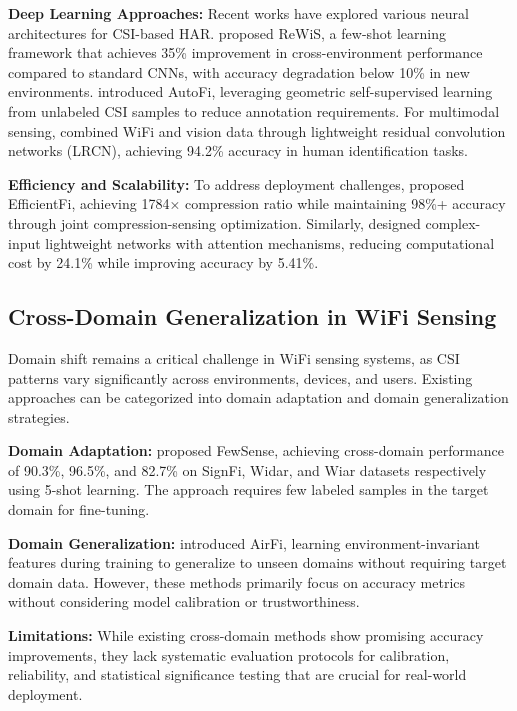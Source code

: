\documentclass[10pt,conference]{IEEEtran}
\begin{document}
\textbf{Deep Learning Approaches:} Recent works have explored various neural architectures for CSI-based HAR. \cite{rewis2022} proposed ReWiS, a few-shot learning framework that achieves 35\% improvement in cross-environment performance compared to standard CNNs, with accuracy degradation below 10\% in new environments. \cite{autofi2022} introduced AutoFi, leveraging geometric self-supervised learning from unlabeled CSI samples to reduce annotation requirements. For multimodal sensing, \cite{gaitfi2022} combined WiFi and vision data through lightweight residual convolution networks (LRCN), achieving 94.2\% accuracy in human identification tasks.

\textbf{Efficiency and Scalability:} To address deployment challenges, \cite{efficientfi2022} proposed EfficientFi, achieving 1784× compression ratio while maintaining 98\%+ accuracy through joint compression-sensing optimization. Similarly, \cite{clnet2021} designed complex-input lightweight networks with attention mechanisms, reducing computational cost by 24.1\% while improving accuracy by 5.41\%.

\subsection{Cross-Domain Generalization in WiFi Sensing}
Domain shift remains a critical challenge in WiFi sensing systems, as CSI patterns vary significantly across environments, devices, and users. Existing approaches can be categorized into domain adaptation and domain generalization strategies.

\textbf{Domain Adaptation:} \cite{fewsense2022} proposed FewSense, achieving cross-domain performance of 90.3\%, 96.5\%, and 82.7\% on SignFi, Widar, and Wiar datasets respectively using 5-shot learning. The approach requires few labeled samples in the target domain for fine-tuning.

\textbf{Domain Generalization:} \cite{airfi2022} introduced AirFi, learning environment-invariant features during training to generalize to unseen domains without requiring target domain data. However, these methods primarily focus on accuracy metrics without considering model calibration or trustworthiness.

\textbf{Limitations:} While existing cross-domain methods show promising accuracy improvements, they lack systematic evaluation protocols for calibration, reliability, and statistical significance testing that are crucial for real-world deployment.
\end{document}
